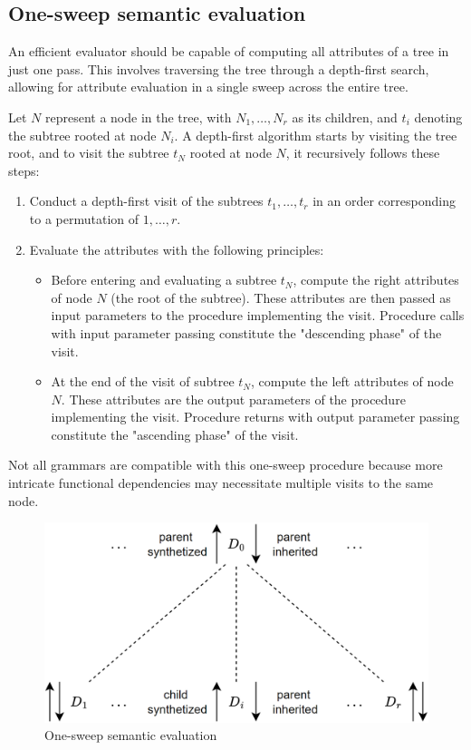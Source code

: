 \subsection{One-sweep semantic evaluation}
An efficient evaluator should be capable of computing all attributes of a tree in just one pass. 
This involves traversing the tree through a depth-first search, allowing for attribute evaluation in a single sweep across the entire tree.

Let $N$ represent a node in the tree, with $N_1, \dots, N_r$ as its children, and $t_i$ denoting the subtree rooted at node $N_i$.
A depth-first algorithm starts by visiting the tree root, and to visit the subtree $t_N$ rooted at node $N$, it recursively follows these steps:
\begin{enumerate}
    \item Conduct a depth-first visit of the subtrees $t_1, \ldots, t_r$ in an order corresponding to a permutation  of $1, \ldots, r$. 
    \item Evaluate the attributes with the following principles:
        \begin{itemize}
            \item Before entering and evaluating a subtree $t_N$, compute the right attributes of node $N$  (the root of the subtree). 
                These attributes are then passed as input parameters to the procedure implementing the visit.
                Procedure calls with input parameter passing constitute the "descending phase" of the visit.
            \item At the end of the visit of subtree $t_N$, compute the left attributes of node $N$. 
                These attributes are the output parameters of the procedure implementing the visit.
                Procedure returns with output parameter passing constitute the "ascending phase" of the visit.
          \end{itemize}
\end{enumerate}
Not all grammars are compatible with this one-sweep procedure because more intricate functional dependencies may necessitate multiple visits to the same node.
\begin{figure}
  \centering
  \includegraphics[width=0.5\linewidth]{images/sweep.png}
  \caption{One-sweep semantic evaluation}
\end{figure}


